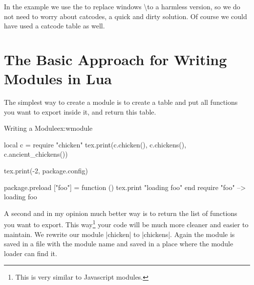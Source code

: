 In the example we use the  to replace windows \textbackslash to a harmless version, so we do not need to worry about catcodes, a quick and dirty solution.  Of course we could have used a catcode table as well.

\section{The Basic Approach for Writing Modules in Lua}

The simplest way to create a module is to create a table and put all functions you want to export inside it, and return this table.

%
%
%
%

\begin{texexample}{Writing a Module}{ex:wmodule}
\begin{luacode*}
local c = require "chicken"
      tex.print(c.chicken(), c.chickens(), c.ancient_chickens())
      
      tex.print(-2, package.config)
      
      package.preload ["foo"] = function () tex.print "loading foo" end
require "foo"  --> loading foo
\end{luacode*}
\end{texexample}

A second and in my opinion much better way is to return the list of functions you want to export. This way\footnote{This is very similar to Javascript modules.} your code will be much more cleaner and easier to maintain. We rewrite our module |chicken|  to |chickens|. Again the module is saved in a file with the module name and saved in a place where the module loader can find it. 

%
%
%
%

